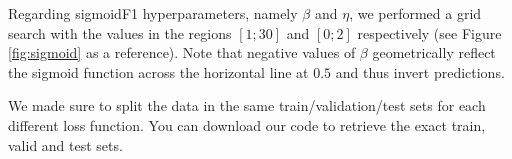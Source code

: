 Regarding sigmoidF1 hyperparameters, namely $\beta$ and $\eta$, we performed a grid search with the values in the regions $[1;30]$ and $[0;2]$ respectively (see Figure \ref{fig:sigmoid} as a reference). Note that negative values of $\beta$ geometrically reflect the sigmoid function across the horizontal line at $0.5$ and thus invert predictions.

We made sure to split the data in the same train/validation/test sets for each different loss function. You can download our code to retrieve the exact train, valid and test sets.









